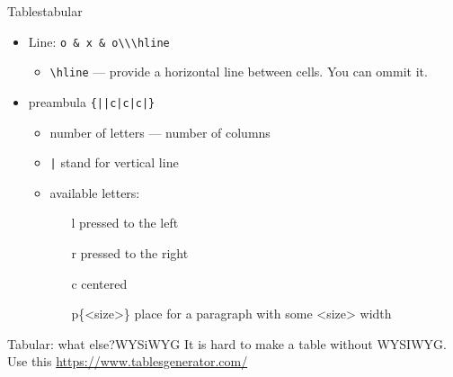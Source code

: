 \begin{frame}[fragile]{Tables\preMagicPage}{tabular}\relax
     \begin{itemize}
         \item Line: \verb!o & x & o\\\hline!
         \begin{itemize}
             $\left.
             \begin{tabular}{p{.4\textwidth}} \vspace{-2ex}
             \item {\csk \&} --- moves to the next cell
             \item {\csk \verb!\\!} --- moves to the next line
             \end{tabular}
             \right\}\text{{\csk it is common, remember!}}$
             \item {\csk \verb!\hline!} --- provide a horizontal line between cells. You can ommit it.
         \end{itemize}
         \item preambula {\csk \verb!{||c|c|c|}!} 
         \begin{itemize}
             \item number of letters --- number of columns
             \item {\csk \verb!|!} stand for vertical line 
             \item available letters:
             \begin{itemize}
                 \item[l] pressed to the left
                 \item[r] pressed to the right
                 \item[c] centered
                 \item[p\{<size>\}] place for a paragraph with some <size> width 
             \end{itemize}
         \end{itemize}
     \end{itemize}
\end{frame}

\begin{frame}[fragile]{Tabular: what else?\magicPage}{WYSiWYG}\relax
It is hard to make a table without WYSIWYG. Use this {\csk\url{https://www.tablesgenerator.com/}}
\end{frame}

